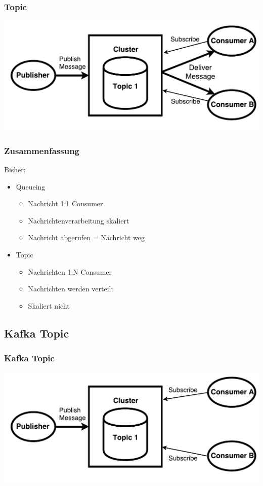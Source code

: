 \begin{frame}
\frametitle{Topic}
	\centering
	\includegraphics[scale=0.6]{figure/topic_draw.pdf}
\end{frame}

\begin{frame}
\frametitle{Zusammenfassung}

Bisher: 
\begin{itemize}
	\item Queueing
	\begin{itemize}
		\item Nachricht 1:1 Consumer
		\item Nachrichtenverarbeitung skaliert
		\item Nachricht abgerufen = Nachricht weg
	\end{itemize}
	\item Topic
	\begin{itemize}
		\item Nachrichten 1:N Consumer
		\item Nachrichten werden verteilt
		\item Skaliert nicht  			%
	\end{itemize}
\end{itemize}
\end{frame}

\subsection{Kafka Topic}
\begin{frame}
\frametitle{Kafka Topic}
\centering
\includegraphics[scale=0.6]{figure/Kafka_topic_draw_subscribe.pdf}
\end{frame}

